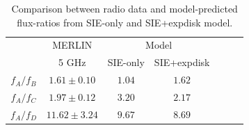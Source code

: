 \documentclass[useAMS,usenatbib]{mnras}
\begin{document}




\begin{table}
 \centering
  \caption{Comparison between radio data \citep{K03} and model-predicted flux-ratios from SIE-only and SIE+expdisk model.}
  \begin{tabular}{@{}ccccccc}

\hline
	& MERLIN  & \multicolumn{2}{c}{Model}\\
		&5 GHz   & SIE-only & SIE+expdisk \\
\hline
$f_A/f_B$			&$1.61 \pm 0.10$ &$1.04$& $1.62$  \\ 
$f_A/f_C$		&$1.97 \pm 0.12$ 	 &$3.20$ & $2.17$ \\
$f_A/f_D$		&$11.62 \pm 3.24 $  &$9.67$& $8.69$ \\

\hline
\end{tabular}

\medskip
\end{table}
\end{document}

